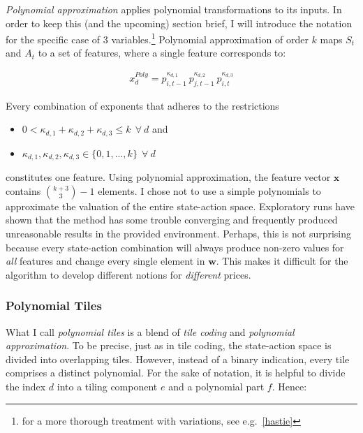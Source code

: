 \emph{Polynomial approximation} applies polynomial transformations to its inputs. In order to keep this (and the upcoming) section brief, I will introduce the notation for the specific case of 3 variables.\footnote{for a more thorough treatment with variations, see e.g.\ \autoref{hastie}} Polynomial approximation of order $k$ maps $S_t$ and $A_t$ to a set of features, where a single feature corresponds to:


\begin{gather}\label{polynomial_extraction}
x_d^{Poly} = p_{i, t-1}^{\kappa_{d,1}} ~ p_{j, t-1}^{\kappa_{d,2}} ~ p_{i, t}^{\kappa_{d,3}}
\end{gather}


Every combination of exponents that adheres to the restrictions

\begin{itemize}
	\item $0 < \kappa_{d,1} + \kappa_{d,2} + \kappa_{d,3} \leq k  ~~ \forall ~ d$ and
	\item $\kappa_{d,1}, \kappa_{d,2}, \kappa_{d,3} \in \{0, 1, ..., k\} ~~  \forall ~ d$
\end{itemize}

constitutes one feature. Using polynomial approximation, the feature vector $\boldsymbol{x}$ contains ${k + 3\choose3}  - 1$ elements. I chose not to use a simple polynomials to approximate the valuation of the entire state-action space. Exploratory runs have shown that the method has some trouble converging and frequently produced unreasonable results in the provided environment. Perhaps, this is not surprising because every state-action combination will always produce non-zero values for \emph{all} features and change every single element in $\boldsymbol{w}$. This makes it difficult for the algorithm to develop different notions for \emph{different} prices.

\subsubsection{Polynomial Tiles}

What I call \emph{polynomial tiles} is a blend of \emph{tile coding} and \emph{polynomial approximation}. To be precise, just as in tile coding, the state-action space is divided into overlapping tiles. However, instead of a binary indication, every tile comprises a distinct polynomial. For the sake of notation, it is helpful to divide the index $d$ into a tiling component $e$ and a polynomial part $f$.  Hence:

